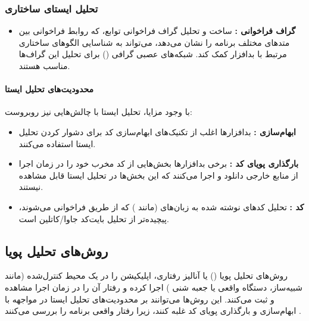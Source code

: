 \subsubsection{تحلیل ایستای ساختاری}
\begin{itemize}
    \item \textbf{گراف فراخوانی :} ساخت و تحلیل گراف فراخوانی توابع، که روابط فراخوانی بین متدهای مختلف برنامه را نشان می‌دهد، می‌تواند به شناسایی الگوهای ساختاری مرتبط با بدافزار کمک کند. شبکه‌های عصبی گرافی () برای تحلیل این گراف‌ها مناسب هستند.
\end{itemize}

\paragraph{محدودیت‌های تحلیل ایستا}
با وجود مزایا، تحلیل ایستا با چالش‌هایی نیز روبروست:
\begin{itemize}
    \item \textbf{ابهام‌سازی :} بدافزارها اغلب از تکنیک‌های ابهام‌سازی کد  برای دشوار کردن تحلیل ایستا استفاده می‌کنند.
    \item \textbf{بارگذاری پویای کد :} برخی بدافزارها بخش‌هایی از کد مخرب خود را در زمان اجرا از منابع خارجی دانلود و اجرا می‌کنند که این بخش‌ها در تحلیل ایستا قابل مشاهده نیستند.
    \item \textbf{کد :} تحلیل کدهای نوشته شده به زبان‌های  (مانند ) که از طریق  فراخوانی می‌شوند، پیچیده‌تر از تحلیل بایت‌کد جاوا/کاتلین است.
\end{itemize}

\subsection{روش‌های تحلیل پویا}
روش‌های تحلیل پویا () یا آنالیز رفتاری، اپلیکیشن را در یک محیط کنترل‌شده (مانند شبیه‌ساز، دستگاه واقعی یا جعبه شنی ) اجرا کرده و رفتار آن را در زمان اجرا مشاهده و ثبت می‌کنند. این روش‌ها می‌توانند بر محدودیت‌های تحلیل ایستا در مواجهه با ابهام‌سازی و بارگذاری پویای کد غلبه کنند، زیرا رفتار واقعی برنامه را بررسی می‌کنند \cite{AndroidMalwareSurvey}.

